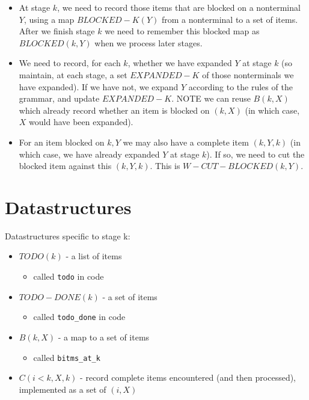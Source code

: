 \documentclass[]{article}
\begin{document}
\begin{multicols}{2}
\begin{itemize}
\itemsep1pt\parskip0pt
\item
  At stage \(k\), we need to record those items that are blocked on a
  nonterminal \(Y\), using a map \(BLOCKED-K(Y)\) from a nonterminal to
  a set of items. After we finish stage \(k\) we need to remember this
  blocked map as \(BLOCKED(k,Y)\) when we process later stages.
\item
  We need to record, for each \(k\), whether we have expanded \(Y\) at
  stage \(k\) (so maintain, at each stage, a set \(EXPANDED-K\) of those
  nonterminals we have expanded). If we have not, we expand \(Y\)
  according to the rules of the grammar, and update \(EXPANDED-K\). NOTE
  we can reuse \(B(k,X)\) which already record whether an item is
  blocked on \((k,X)\) (in which case, \(X\) would have been expanded).
\item
  For an item blocked on \(k,Y\) we may also have a complete item
  \((k,Y,k)\) (in which case, we have already expanded \(Y\) at stage
  \(k\)). If so, we need to cut the blocked item against this
  \((k,Y,k)\). This is \(W-CUT-BLOCKED(k,Y)\).
\end{itemize}

\section{Datastructures}

Datastructures specific to stage k:

\begin{itemize}
\itemsep1pt\parskip0pt
\item
  \(TODO(k)\) - a list of items

  \begin{itemize}
  \itemsep1pt\parskip0pt
  \item
    called \texttt{todo} in code
  \end{itemize}
\item
  \(TODO-DONE(k)\) - a set of items

  \begin{itemize}
  \itemsep1pt\parskip0pt
  \item
    called \texttt{todo\_done} in code
  \end{itemize}
\item
  \(B(k,X)\) - a map to a set of items

  \begin{itemize}
  \itemsep1pt\parskip0pt
  \item
    called \texttt{bitms\_at\_k}
  \end{itemize}
\item
  \(C(i<k,X,k)\) - record complete items encountered (and then
  processed), implemented as a set of \((i,X)\)


\end{itemize}
\end{multicols}
\end{document}
